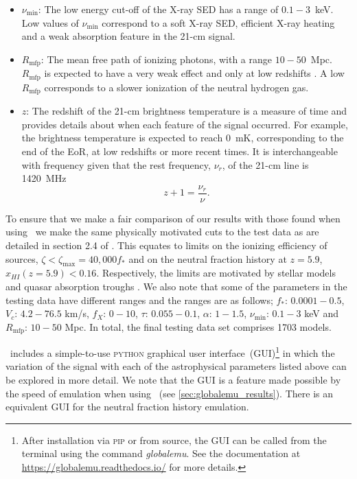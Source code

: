 \begin{itemize}
    \item $\nu_\mathrm{min}$: The low energy cut-off of the X-ray SED has a range of $0.1-3$~keV. Low values of $\nu_\mathrm{min}$ correspond to a soft X-ray SED, efficient X-ray heating and a weak absorption feature in the 21-cm signal.
    \item $R_\mathrm{mfp}$: The mean free path of ionizing photons, with a range $10-50$~Mpc. $R_\mathrm{mfp}$ is expected to have a very weak effect and only at low redshifts \citep[see e.g. ][]{Monsalve_EDGES_HB_3_2019}. A low $R_\mathrm{mfp}$ corresponds to a slower ionization of the neutral hydrogen gas.
    \item $z$: The redshift of the 21-cm brightness temperature is a measure of time and provides details about when each feature of the signal occurred. For example, the brightness temperature is expected to reach 0~mK, corresponding to the end of the EoR, at low redshifts or more recent times. It is interchangeable with frequency given that the rest frequency, $\nu_r$, of the 21-cm line is 1420~MHz
    \begin{equation}
        z + 1 = \frac{\nu_r}{\nu}.
    \end{equation}
\end{itemize}

To ensure that we make a fair comparison of our results with those found when using \cmGEM~we make the same physically motivated cuts to the test data as are detailed in section 2.4 of \cite{Cohen2020}. This equates to limits on the ionizing efficiency of sources, $\zeta < \zeta_\mathrm{max} = 40,000 f_*$ and on the neutral fraction history at $z = 5.9$, $x_{HI}(z = 5.9) < 0.16$. Respectively, the limits are motivated by stellar models \citep{Bromm2001} and quasar absorption troughs \citep{McGreer2014}. We also note that some of the parameters in the testing data have different ranges and the ranges are as follows; $f_*$: $0.0001 - 0.5$, $V_c$: $4.2 - 76.5$ km/s, $f_X$: $0-10$, $\tau$: $0.055 - 0.1$, $\alpha$: $1 - 1.5$, $\nu_\mathrm{min}$: $0.1 - 3$ keV and $R_\mathrm{mfp}$: $10 - 50$ Mpc. In total, the final testing data set comprises 1703 models.

\name~includes a simple-to-use \textsc{python} graphical user interface~(GUI)\footnote{After installation via \textsc{pip} or from source, the GUI can be called from the terminal using the command \textit{globalemu}. See the documentation at \url{https://globalemu.readthedocs.io/} for more details.} in which the variation of the signal with each of the astrophysical parameters listed above can be explored in more detail.
We note that the GUI is a feature made possible by the speed of emulation when using \name~(see \cref{sec:globalemu_results}).
There is an equivalent GUI for the neutral fraction history emulation.

